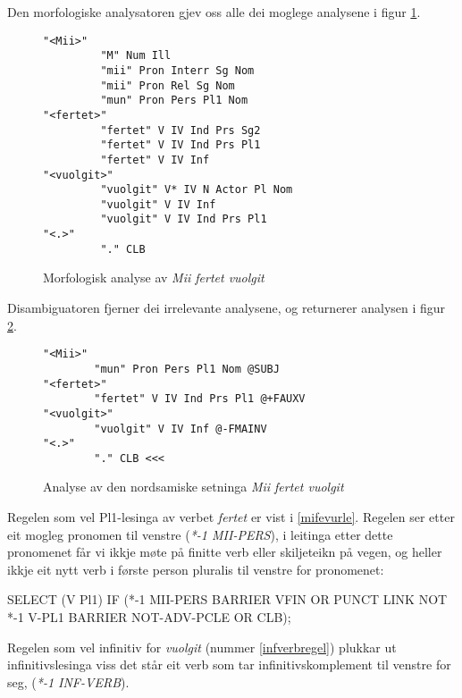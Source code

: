 \documentclass[a4paper,norsk]{article}
\begin{document}
Den morfologiske analysatoren gjev oss alle dei moglege analysene i figur \ref{mifevumulti}.%

\begin{figure}[htbp]
\begin{center}
\begin{verbatim}
"<Mii>"
         "M" Num Ill
         "mii" Pron Interr Sg Nom
         "mii" Pron Rel Sg Nom
         "mun" Pron Pers Pl1 Nom
"<fertet>"
         "fertet" V IV Ind Prs Sg2
         "fertet" V IV Ind Prs Pl1
         "fertet" V IV Inf
"<vuolgit>"
         "vuolgit" V* IV N Actor Pl Nom
         "vuolgit" V IV Inf
         "vuolgit" V IV Ind Prs Pl1
"<.>"
         "." CLB
\end{verbatim}
\caption{Morfologisk analyse av \textit{Mii fertet vuolgit}}
\label{mifevumulti}
\end{center}
\end{figure}

Disambiguatoren fjerner dei irrelevante analysene, og returnerer analysen i figur \ref{mifevu}. %

\begin{figure}[htbp]
\begin{center}
\begin{verbatim}
"<Mii>"
        "mun" Pron Pers Pl1 Nom @SUBJ
"<fertet>"
        "fertet" V IV Ind Prs Pl1 @+FAUXV
"<vuolgit>"
        "vuolgit" V IV Inf @-FMAINV
"<.>"
        "." CLB <<<
\end{verbatim}        
\caption{Analyse av den nordsamiske setninga \textit{Mii fertet vuolgit}}
\label{mifevu}
\end{center}
\end{figure}

Regelen som vel Pl1-lesinga av verbet \textit{fertet} er vist i \ref{mifevurle}. Regelen ser etter eit mogleg pronomen til venstre (\textit{*-1 MII-PERS}), i leitinga etter dette pronomenet får vi ikkje møte på finitte verb eller skiljeteikn på vegen, og heller ikkje eit nytt verb i første person pluralis til venstre for pronomenet:%

\begin{example}\label{mifevurle}
SELECT (V Pl1) IF (*-1 MII-PERS BARRIER VFIN OR PUNCT LINK NOT *-1 V-PL1 
	BARRIER NOT-ADV-PCLE OR CLB);
\end{example}	

Regelen som vel infinitiv for \textit{vuolgit} (nummer \ref{infverbregel}) plukkar ut infinitivslesinga viss det står eit verb som tar infinitivskomplement til venstre for seg, (\textit{*-1 INF-VERB}). %
\end{document}

